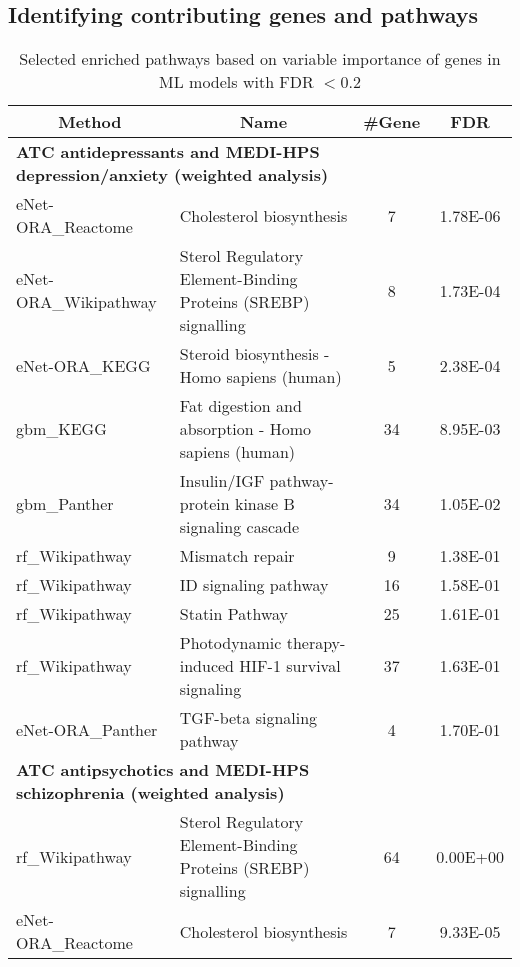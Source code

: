   \subsection{Identifying contributing genes and pathways}

    \begin{sidewaystable}
      \centering
      \caption{Selected enriched pathways based on variable importance of genes in ML models  with FDR $< 0.2$}
      \begin{threeparttable}
        \begin{tabular}{llcc}
          \toprule
          \multicolumn{1}{c}{\textbf{Method}} & \multicolumn{1}{c}{\textbf{Name}} & \textbf{\#Gene} & \textbf{FDR} \\
          \midrule
          \multicolumn{2}{l}{\textbf{ATC antidepressants and MEDI-HPS depression/anxiety (weighted analysis)}} &       &  \\
          \midrule
          eNet-ORA\_Reactome & Cholesterol biosynthesis & 7     & 1.78E-06 \\
          eNet-ORA\_Wikipathway & Sterol Regulatory Element-Binding Proteins (SREBP) signalling & 8     & 1.73E-04 \\
          eNet-ORA\_KEGG & Steroid biosynthesis - Homo sapiens (human) & 5     & 2.38E-04 \\
          gbm\_KEGG & Fat digestion and absorption - Homo sapiens (human) & 34    & 8.95E-03 \\
          gbm\_Panther & Insulin/IGF pathway-protein kinase B signaling cascade & 34    & 1.05E-02 \\
          rf\_Wikipathway & Mismatch repair & 9     & 1.38E-01 \\
          rf\_Wikipathway & ID signaling pathway & 16    & 1.58E-01 \\
          rf\_Wikipathway & Statin Pathway & 25    & 1.61E-01 \\
          rf\_Wikipathway & Photodynamic therapy-induced HIF-1 survival signaling & 37    & 1.63E-01 \\
          eNet-ORA\_Panther & TGF-beta signaling pathway & 4     & 1.70E-01 \\
          \multicolumn{2}{l}{\textbf{ATC antipsychotics and MEDI-HPS schizophrenia (weighted analysis)}} &       &  \\
          rf\_Wikipathway & Sterol Regulatory Element-Binding Proteins (SREBP) signalling & 64    & 0.00E+00 \\
          eNet-ORA\_Reactome & Cholesterol biosynthesis & 7     & 9.33E-05 \\

\end{tabular}
\end{threeparttable}
\end{sidewaystable}
